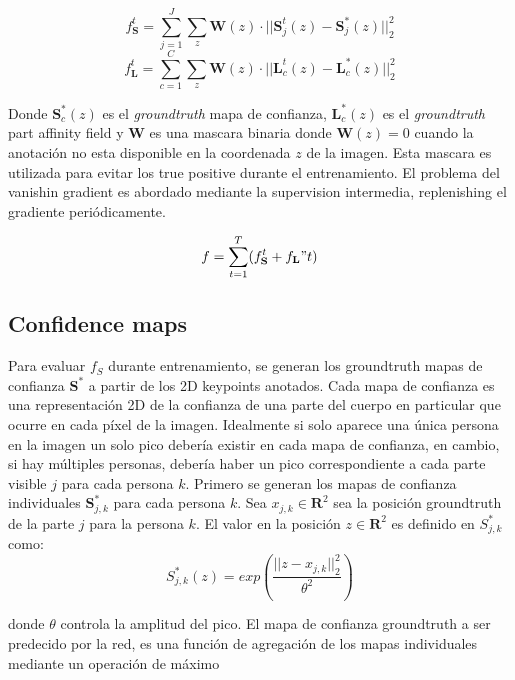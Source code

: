 \documentclass[runningheads]{llncs}
\begin{document}
\begin{equation}
f_{\textbf{S}}^t = \sum_{j=1}^{J} \sum_{z} \textbf{W}(z) \cdot || \textbf{S}_{j}^t(z) - \textbf{S}_{j}^*(z)||_2^2
\end{equation}
\begin{equation}
f_{\textbf{L}}^t = \sum_{c=1}^{C} \sum_{z} \textbf{W}(z) \cdot || \textbf{L}_{c}^t(z) - \textbf{L}_{c}^*(z)||_2^2
\end{equation}

Donde $\textbf{S}_{c}^*(z)$ es el \textit{groundtruth} mapa de confianza, $\textbf{L}_{c}^*(z)$ es el \textit{groundtruth} part affinity field y $\textbf{W}$ es una mascara binaria donde $\textbf{W}(z) = 0$ cuando la anotación no esta disponible en la coordenada $z$ de la imagen. Esta mascara es utilizada para evitar los true positive durante el entrenamiento. El problema del vanishin gradient es abordado mediante la supervision intermedia, replenishing el gradiente periódicamente.

\begin{equation}
f = \sum_{t=1}^{T}(f_{\textbf{S}}^t + f_{\textbf{L}}"t)
\end{equation} 


\subsection{Confidence maps}
Para evaluar $f_S$ durante entrenamiento, se generan los groundtruth mapas de confianza $\textbf{S}^*$ a partir de los 2D keypoints anotados. Cada mapa de confianza es una representación 2D de la confianza de una parte del cuerpo en particular que ocurre en cada píxel de la imagen. Idealmente si solo aparece una única persona en la imagen un solo pico debería existir en cada mapa de confianza, en cambio, si hay múltiples personas, debería haber un pico correspondiente a cada parte visible $j$ para cada persona $k$.
Primero se generan los mapas de confianza individuales  $\textbf{S}_{j,k}
^*$ para cada persona $k$. Sea $x_{j,k} \in \mathbf{R}^2$ sea la posición groundtruth de la parte $j$ para la persona $k$. El valor en la posición $z \in \mathbf{R}^2$ es definido en $S_{j,k}^*$ como:
\begin{equation}
S_{j,k}^*(z) = exp(\frac{||z - x_{j,k}||_2^2}{\theta^2})
\end{equation}

donde $\theta$ controla la amplitud del pico. El mapa de confianza groundtruth a ser predecido por la red, es una función de agregación de los mapas individuales mediante un operación de máximo
\end{document}
